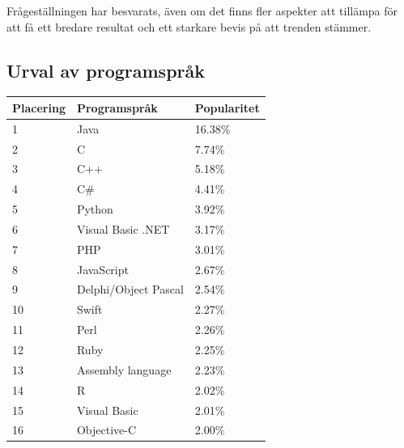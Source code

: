 \documentclass[12pt,swedish]{article}
\begin{document}
Frågeställningen har besvarats, även om det finns fler aspekter att tillämpa för att få ett bredare resultat och ett starkare bevis på att trenden stämmer.

\printbibliography

\clearpage
\begin{appendices}


\section{Urval av programspråk}\label{appendix:languages}
\begin{table}[H]
\centering
\label{appendix:table:languages}
\begin{tabular}{lll}
\toprule
Placering & Programspråk         & Popularitet \\ \midrule
1         & Java                 & 16.38\%     \\
2         & C                    & 7.74\%      \\
3         & C++                  & 5.18\%      \\
4         & C\#                  & 4.41\%      \\
5         & Python               & 3.92\%      \\
6         & Visual Basic .NET    & 3.17\%      \\
7         & PHP                  & 3.01\%      \\
8         & JavaScript           & 2.67\%      \\
9         & Delphi/Object Pascal & 2.54\%      \\
10        & Swift                & 2.27\%      \\
11        & Perl                 & 2.26\%      \\
12        & Ruby                 & 2.25\%      \\
13        & Assembly language    & 2.23\%      \\
14        & R                    & 2.02\%      \\
15        & Visual Basic         & 2.01\%      \\
16        & Objective-C          & 2.00\%      \\

\end{tabular}
\end{table}
\end{appendices}
\end{document}
